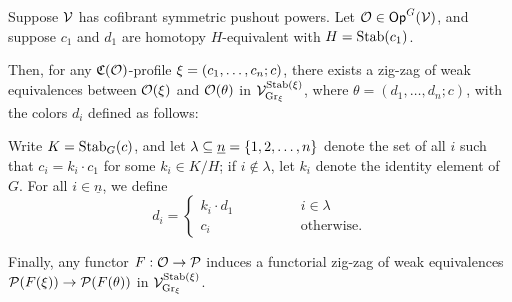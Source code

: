 \documentclass[a4paper,10pt
]{article}%
\renewcommand{\1}{\ensuremath{\mathbb{id}}}
\begin{document}
\begin{lemma}
      \label{CAV_4.14_PROP2}
      Suppose $\mathcal V$ has cofibrant symmetric pushout powers.
      Let $\mathcal{O} \in \mathsf{Op}^G(\mathcal V)$, and suppose
      $c_1$ and $d_1$ are homotopy $H$-equivalent with $H = \mathrm{Stab}(c_1)$.

      Then, for any $\mathfrak C(\mathcal{O})$-profile $\xi = (c_1,\dots,c_n;c)$,
      there exists a zig-zag of weak equivalences between
      $\mathcal{O}(\xi)$ and $\mathcal{O}(\theta)$
      in $\mathcal V^{\mathrm{Stab}(\xi)}_{\mathrm{Gr}_\xi}$,
      where
      $\theta = (d_1,\ldots, d_n; c)$, with the colors $d_i$ defined as follows:
            
      Write $K = \mathrm{Stab}_G(c)$, and let $\lambda \subseteq \underline{n} = \left\{1,2,\ldots, n\right\}$ denote
      the set of all $i$ such that $c_i = k_i \cdot c_1$ for some $k_i\in K/H$;
      if $i \notin \lambda$, let $k_i$ denote the identity element of $G$.
      For all $i \in \underline{n}$, we define
      \begin{equation}
            \label{DCOLORS_EQ}
            d_i =
            \begin{cases}
                  k_i \cdot d_1 \qquad \qquad & i \in \lambda
                  \\
                  c_i & \mbox{otherwise.}
            \end{cases}
      \end{equation}
      
      Finally, any functor $F: \mathcal{O} \to \mathcal{P}$ induces a functorial zig-zag of weak equivalences
      $\mathcal{P}(F(\xi)) \to \mathcal{P}(F(\theta))$ in $\mathcal V^{\mathrm{Stab}(\xi)}_{\mathrm{Gr}_\xi}$.
\end{lemma}
\end{document}

